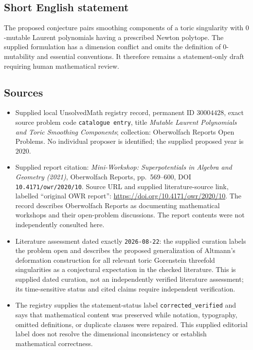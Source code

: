 \documentclass[11pt]{article}
\begin{document}
\subsection{Short English statement}
The proposed conjecture pairs smoothing components of a toric singularity with \(0\)-mutable Laurent polynomials having a prescribed Newton polytope. The supplied formulation has a dimension conflict and omits the definition of \(0\)-mutability and essential conventions. It therefore remains a statement-only draft requiring human mathematical review.
\subsection{Sources}
\begin{itemize}
\item Supplied local UnsolvedMath registry record, permanent ID \(30004428\), exact source problem code \texttt{catalogue entry}, title \emph{Mutable Laurent Polynomials and Toric Smoothing Components}; collection: Oberwolfach Reports Open Problems. No individual proposer is identified; the supplied proposed year is \(2020\).
\item Supplied report citation: \emph{Mini-Workshop: Superpotentials in Algebra and Geometry (2021)}, Oberwolfach Reports, pp.\ 569--600, DOI \texttt{10.4171/owr/2020/10}. Source URL and supplied literature-source link, labelled ``original OWR report'': \url{https://doi.org/10.4171/owr/2020/10}. The record describes Oberwolfach Reports as documenting mathematical workshops and their open-problem discussions. The report contents were not independently consulted here.
\item Literature assessment dated exactly \texttt{2026-08-22}: the supplied curation labels the problem open and describes the proposed generalization of Altmann's deformation construction for all relevant toric Gorenstein threefold singularities as a conjectural expectation in the checked literature. This is supplied dated curation, not an independently verified literature assessment; its time-sensitive status and cited claims require independent verification.
\item The registry supplies the statement-status label \texttt{corrected\_verified} and says that mathematical content was preserved while notation, typography, omitted definitions, or duplicate clauses were repaired. This supplied editorial label does not resolve the dimensional inconsistency or establish mathematical correctness.
\end{itemize}
\end{document}
